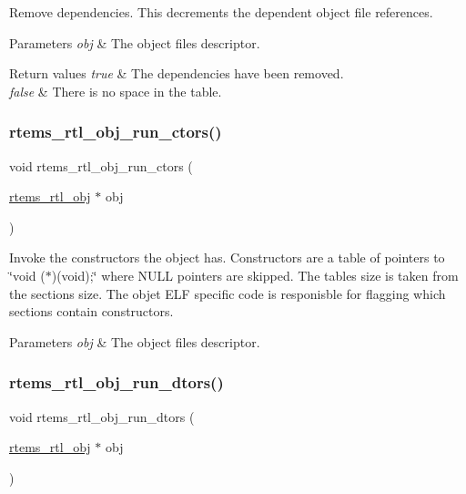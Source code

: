Remove dependencies. This decrements the dependent object file references.


\begin{DoxyParams}{Parameters}
{\em obj} & The object file\textquotesingle{}s descriptor. \\
\hline
\end{DoxyParams}

\begin{DoxyRetVals}{Return values}
{\em true} & The dependencies have been removed. \\
\hline
{\em false} & There is no space in the table. \\
\hline
\end{DoxyRetVals}
\mbox{\label{rtl-obj_8c_ab61d5e574b2e115b9fa004bdd2619f23}} 
\subsubsection{\texorpdfstring{rtems\_rtl\_obj\_run\_ctors()}{rtems\_rtl\_obj\_run\_ctors()}}
{\footnotesize\ttfamily void rtems\+\_\+rtl\+\_\+obj\+\_\+run\+\_\+ctors (\begin{DoxyParamCaption}\item[{\mbox{\hyperlink{structrtems__rtl__obj}{rtems\+\_\+rtl\+\_\+obj}} $\ast$}]{obj }\end{DoxyParamCaption})}

Invoke the constructors the object has. Constructors are a table of pointers to \char`\"{}void ($\ast$)(void);\char`\"{} where N\+U\+LL pointers are skipped. The table\textquotesingle{}s size is taken from the section\textquotesingle{}s size. The objet E\+LF specific code is responisble for flagging which sections contain constructors.


\begin{DoxyParams}{Parameters}
{\em obj} & The object file\textquotesingle{}s descriptor. \\
\hline
\end{DoxyParams}
\mbox{\label{rtl-obj_8c_a4c2ee2202085fecf74954e175a0fb7e3}} 
\subsubsection{\texorpdfstring{rtems\_rtl\_obj\_run\_dtors()}{rtems\_rtl\_obj\_run\_dtors()}}
{\footnotesize\ttfamily void rtems\+\_\+rtl\+\_\+obj\+\_\+run\+\_\+dtors (\begin{DoxyParamCaption}\item[{\mbox{\hyperlink{structrtems__rtl__obj}{rtems\+\_\+rtl\+\_\+obj}} $\ast$}]{obj }\end{DoxyParamCaption})}

